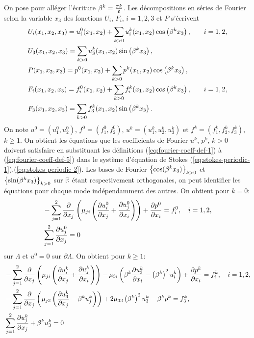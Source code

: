 On pose pour alléger l'écriture $\beta^k = \frac{\pi
k}{\varepsilon}$. Les décompositions en séries de Fourier selon la
variable $x_3$ des fonctions $U_i$, $F_i$, $i = 1,2,3$ et $P$ s'écrivent
\begin{align}
  &U_i(x_1, x_2, x_3) = u_i^0(x_1, x_2) %
                       + \sum_{k > 0} u_i^k(x_1, x_2)%
                       \cos\parent{\beta^kx_3}, &\quad i = 1, 2,\label{eq:fourier-coeff-def-1}\\
  &U_3(x_1, x_2, x_3) = \sum_{k > 0} u_3^k(x_1, x_2)%
                        \sin\parent{\beta^kx_3},\label{eq:fourier-coeff-def-2}\\
  &P(x_1, x_2, x_3) = p^0(x_1, x_2) %
                      + \sum_{k>0}p^k(x_1, x_2)%
                      \cos\parent{\beta^kx_3},\label{eq:fourier-coeff-def-3}\\
  &F_i(x_1, x_2, x_3) = f_i^0(x_1, x_2) %
                        + \sum_{k > 0}f_i^k(x_1, x_2)%
                        \cos\parent{\beta^kx_3}, &\quad i = 1,2,\label{eq:fourier-coeff-def-4}\\
  &F_3(x_1, x_2, x_3) = \sum_{k > 0}f_3^k(x_1,x_2)%
                        \sin\parent{\beta^kx_3}.\label{eq:fourier-coeff-def-5}
\end{align}
On note $u^0 = (u^0_1, u^0_2)$, $f^0 = (f^0_1, f^0_2)$, $u^k =
(u^k_1,u^k_2,u^k_3)$ et $f^k = (f^k_1, f^k_2, f^k_3)$, $k \geq 1$. On
obtient les équations que les coefficients de Fourier $u^k$, $p^k$,
$k>0$ doivent satisfaire en substituant les définitions
(\ref{eq:fourier-coeff-def-1}) à (\ref{eq:fourier-coeff-def-5}) dans
le système d'équation de Stokes
(\ref{eq:stokes-periodic-1}),(\ref{eq:stokes-periodic-2}). Les bases
de Fourier $\left\{ \cos(\beta^k x_3) \right\}_{k > 0}$ et
$\left\{ \sin(\beta^kx_3) \right\}_{k>0}$ sur $\mathbb R$ étant
respectivement orthogonales, on peut identifier les équations pour
chaque mode indépendamment des autres. On obtient pour $k = 0$:
\begin{align}
  &-\sum_{j = 1}^2\frac{\partial}{\partial
    x_j}\left( \mu_{ji}\left( \frac{\partial u_i^0}{\partial x_j} +
      \frac{\partial u_j^0}{\partial x_i} \right) \right) + \frac{\partial
    p^0}{\partial x_i} = f_i^0, \quad i = 1,2,\label{eq:fourier-fund-1}\\
  &\sum_{j = 1}^2 \frac{\partial u_j^0}{\partial x_j} = 0\label{eq:fourier-fund-2}
\end{align}
sur $\Lambda$ et $u^0 = 0$ sur $\partial \Lambda$. On obtient pour $k
\geq 1$:
\begin{align}
  &-\sum_{j = 1}^2\frac{\partial}{\partial
    x_j}\left( \mu_{ji}\left( \frac{\partial u_i^k}{\partial x_j} +
      \frac{\partial u_j^k}{\partial x_i} \right) \right) -
  \mu_{3i}\left( \beta^k\frac{\partial u_3^k}{\partial x_i} -
    \left( \beta^k \right)^2 u_i^k \right) + \frac{\partial p^k}{\partial x_i} = f_i^k,\quad
  i = 1,2,\label{eq:fourier-harm-1}\\
  &-\sum_{j = 1}^2\frac{\partial}{\partial
    x_j}\left( \mu_{j3}\left( \frac{\partial u_3^k}{\partial x_j} -
      \beta^k u_j^k \right) \right) + 2\mu_{33}\left( \beta^k \right)^2 u_3^k - \beta^k p^k =
  f_3^k,\label{eq:fourier-harm-2}\\
  &\sum_{j = 1}^2\frac{\partial u_j^k}{\partial x_j} + \beta^k u_3^k = 0\label{eq:fourier-harm-3}
\end{align}

